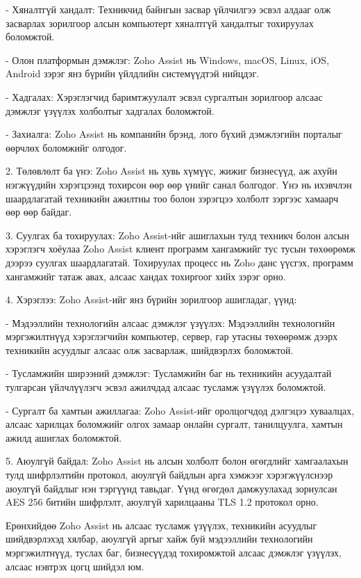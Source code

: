 - Хяналтгүй хандалт: Техникчид байнгын засвар үйлчилгээ эсвэл алдааг олж засварлах зорилгоор алсын компьютерт хяналтгүй хандалтыг тохируулах боломжтой.

- Олон платформын дэмжлэг: Zoho Assist нь Windows, macOS, Linux, iOS, Android зэрэг янз бүрийн үйлдлийн системүүдтэй нийцдэг.

- Хадгалах: Хэрэглэгчид баримтжуулалт эсвэл сургалтын зорилгоор алсаас дэмжлэг үзүүлэх холболтыг хадгалах боломжтой.

- Захиалга: Zoho Assist нь компанийн брэнд, лого бүхий дэмжлэгийн порталыг өөрчлөх боломжийг олгодог.

2. Төлөвлөлт ба үнэ: Zoho Assist нь хувь хүмүүс, жижиг бизнесүүд, аж ахуйн нэгжүүдийн хэрэгцээнд тохирсон өөр өөр үнийг санал болгодог. Үнэ нь ихэвчлэн шаардлагатай техникийн ажилтны тоо болон зэрэгцээ холболт зэргээс хамаарч өөр өөр байдаг.

3. Суулгах ба тохируулах: Zoho Assist-ийг ашиглахын тулд техникч болон алсын хэрэглэгч хоёулаа Zoho Assist клиент программ хангамжийг тус тусын төхөөрөмж дээрээ суулгах шаардлагатай. Тохируулах процесс нь Zoho данс үүсгэх, программ хангамжийг татаж авах, алсаас хандах тохиргоог хийх зэрэг орно.

4. Хэрэглээ: Zoho Assist-ийг янз бүрийн зорилгоор ашигладаг, үүнд:

- Мэдээллийн технологийн алсаас дэмжлэг үзүүлэх: Мэдээллийн технологийн мэргэжилтнүүд хэрэглэгчийн компьютер, сервер, гар утасны төхөөрөмж дээрх техникийн асуудлыг алсаас олж засварлаж, шийдвэрлэх боломжтой.

- Тусламжийн ширээний дэмжлэг: Тусламжийн баг нь техникийн асуудалтай тулгарсан үйлчлүүлэгч эсвэл ажилчдад алсаас тусламж үзүүлэх боломжтой.

- Сургалт ба хамтын ажиллагаа: Zoho Assist-ийг оролцогчдод дэлгэцээ хуваалцах, алсаас харилцах боломжийг олгох замаар онлайн сургалт, танилцуулга, хамтын ажилд ашиглах боломжтой.

5. Аюулгүй байдал: Zoho Assist нь алсын холболт болон өгөгдлийг хамгаалахын тулд шифрлэлтийн протокол, аюулгүй байдлын арга хэмжээг хэрэгжүүлснээр аюулгүй байдлыг нэн тэргүүнд тавьдаг. Үүнд өгөгдөл дамжуулахад зориулсан AES 256 битийн шифрлэлт, аюулгүй харилцааны TLS 1.2 протокол орно.

Ерөнхийдөө Zoho Assist нь алсаас тусламж үзүүлэх, техникийн асуудлыг шийдвэрлэхэд хялбар, аюулгүй аргыг хайж буй мэдээллийн технологийн мэргэжилтнүүд, туслах баг, бизнесүүдэд тохиромжтой алсаас дэмжлэг үзүүлэх, алсаас нэвтрэх цогц шийдэл юм.

